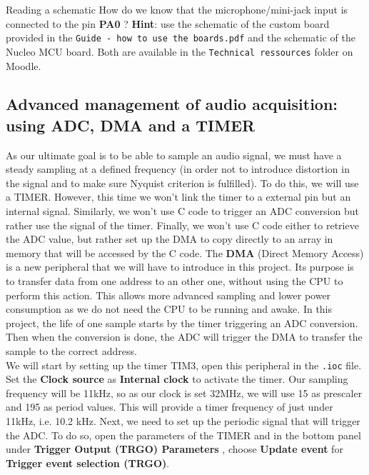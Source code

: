 \begin{bclogo}[couleur = gray!20, arrondi = 0.2, logo=\bcquestion]{Reading a schematic}
How do we know that the microphone/mini-jack input is connected to the pin \textbf{PA0} ? \textbf{Hint}: use the schematic of the custom board provided in the \texttt{Guide - how to use the boards.pdf} and the schematic of the Nucleo MCU board. Both are available in the \texttt{Technical ressources} folder on Moodle.
\end{bclogo}


\subsection{Advanced management of audio acquisition: using ADC, DMA and a TIMER}

\noindent As our ultimate goal is to be able to sample an audio signal, we must have a steady sampling at a defined frequency (in order not to introduce distortion in the signal and to make sure Nyquist criterion is fulfilled). To do this, we will use a TIMER. However, this time we won't link the timer to a external pin but an internal signal. Similarly, we won't use C code to trigger an ADC conversion but rather use the signal of the timer. Finally, we won't use C code either to retrieve the ADC value, but rather set up the DMA to copy directly to an array in memory that will be accessed by the C code. The \textbf{DMA} (Direct Memory Access) is a new peripheral that we will have to introduce in this project. Its purpose is to transfer data from one address to an other one, without using the CPU to perform this action. This allows more advanced sampling and lower power consumption as we do not need the CPU to be running and awake. In this project, the life of one sample starts by the timer triggering an ADC conversion. Then when the conversion is done, the ADC will trigger the DMA to transfer the sample to the correct address. \\

\noindent We will start by setting up the timer TIM3, open this peripheral in the \texttt{.ioc} file. Set the \textbf{Clock source} as \textbf{Internal clock} to activate the timer. Our sampling frequency will be 11kHz, so as our clock is set 32MHz, we will use 15 as prescaler and 195 as period values. This will provide a timer frequency of just under 11kHz, i.e. 10.2 kHz. Next, we need to set up the periodic signal that will trigger the ADC. To do so, open the parameters of the TIMER and in the bottom panel under \textbf{Trigger Output (TRGO) Parameters} , choose \textbf{Update event} for \textbf{Trigger event selection (TRGO)}. \\

